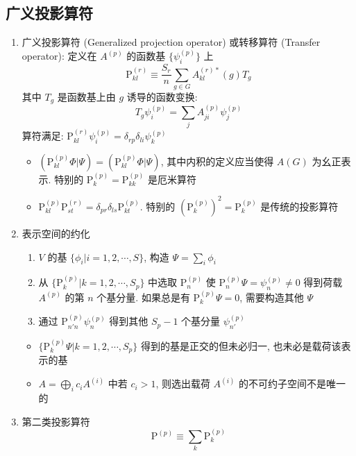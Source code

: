 \documentclass[12pt,a4paper]{article}%
\numberwithin{equation}{section}%
\begin{document}
\subsection{广义投影算符} %
\label{sub:general_proj}
\begin{enumerate}
	\item 广义投影算符 (Generalized projection operator) 或转移算符 (Transfer operator): 定义在 $A^{(p)}$ 的函数基 $\{\psi_i^{(p)}\}$ 上
	\begin{equation}
		\mathrm P_{kl}^{(r)}\equiv \frac{S_r}{n}\sum_{g\in G}A_{kl}^{(r)*}(g)T_g
	\end{equation} %
	其中 $T_g$ 是函数基上由 $g$ 诱导的函数变换:
	\begin{equation}
	 	T_g\psi_i^{(p)} = \sum_j A^{(p)}_{ji}\psi_j^{(p)}
	\end{equation}
	算符满足: $\mathrm P_{kl}^{(r)}\psi_i^{(p)} = \delta_{rp}\delta_{li}\psi_k^{(p)}$
	\begin{itemize}
		\item $\left(\mathrm P_{kl}^{(p)}\Phi|\Psi\right) = \left(\mathrm P_{kl}^{(p)}\Phi|\Psi\right)$, 其中内积的定义应当使得 $A(G)$ 为幺正表示. 特别的 $\mathrm P_k^{(p)} = \mathrm P_{kk}^{(p)}$ 是厄米算符
		\item $\mathrm P_{kl}^{(p)}\mathrm P_{st}^{(r)} = \delta_{pr}\delta_{ls}\mathrm P_{kt}^{(p)}$. 特别的 $(\mathrm P_k^{(p)})^2 = \mathrm P_k^{(p)}$ 是传统的投影算符
	\end{itemize}
	\item 表示空间的约化
	\begin{enumerate}
		\item $V$ 的基 $\{\phi_i|i=1,2,\cdots, S\}$, 构造 $\Psi = \sum_i\phi_i$
		\item 从 $\{\mathrm P_k^{(p)}|k=1,2,\cdots, S_p\}$ 中选取 $\mathrm P_n^{(p)}$ 使 $\mathrm P_n^{(p)}\Psi = \psi_n^{(p)} \neq 0$ 得到荷载 $A^{(p)}$ 的第 $n$ 个基分量. 如果总是有 $\mathrm P_k^{(p)}\Psi = 0$, 需要构造其他 $\Psi$
		\item 通过 $\mathrm P_{n'n}^{(p)}\psi_n^{(p)}$ 得到其他 $S_p-1$ 个基分量 $\psi_{n'}^{(p)}$
	\end{enumerate}
	\begin{itemize}
		\item $\{\mathrm P_k^{(p)}\Psi|k=1,2,\cdots, S_p\}$ 得到的基是正交的但未必归一, 也未必是载荷该表示的基
		\item $A = \bigoplus_i c_i A^{(i)}$ 中若 $c_i>1$, 则选出载荷 $A^{(i)}$ 的不可约子空间不是唯一的
	\end{itemize}
	\item 第二类投影算符
	\begin{equation}
		\mathrm P^{(p)} \equiv \sum_k \mathrm P_k^{(p)}
	\end{equation}
\end{enumerate}
\newcommand{\Group}[1]{\mathrm{#1}}
\newcommand{\trans}{^\mathrm{T}}
\newcommand{\st}{\quad\mathrm{s.t.}\quad}
\end{document}
